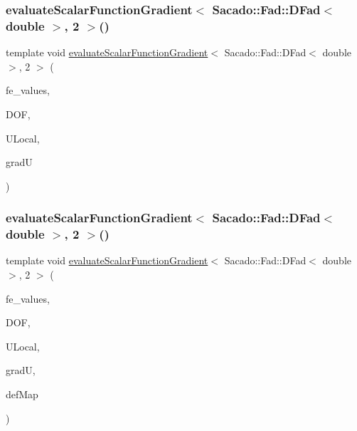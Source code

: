 \subsubsection{\texorpdfstring{evaluate\+Scalar\+Function\+Gradient$<$ Sacado\+::\+Fad\+::\+D\+Fad$<$ double $>$, 2 $>$()}{evaluateScalarFunctionGradient< Sacado::Fad::DFad< double >, 2 >()}\hspace{0.1cm}{\footnotesize\ttfamily [1/4]}}
{\footnotesize\ttfamily template void \mbox{\hyperlink{group___evaluation_functions_gabedd4ae2841d2332ed0df0513b189e34}{evaluate\+Scalar\+Function\+Gradient}}$<$ Sacado\+::\+Fad\+::\+D\+Fad$<$ double $>$, 2 $>$ (\begin{DoxyParamCaption}\item[{const F\+E\+Values$<$ 2 $>$ \&}]{fe\+\_\+values,  }\item[{unsigned int}]{D\+OF,  }\item[{Table$<$ 1, Sacado\+::\+Fad\+::\+D\+Fad$<$ double $>$$>$ \&}]{U\+Local,  }\item[{Table$<$ 2, Sacado\+::\+Fad\+::\+D\+Fad$<$ double $>$$>$ \&}]{gradU }\end{DoxyParamCaption})}

\mbox{\label{function_evaluations_8cc_a9314f95484440c9c86bff06911c6d52e}} 
\subsubsection{\texorpdfstring{evaluate\+Scalar\+Function\+Gradient$<$ Sacado\+::\+Fad\+::\+D\+Fad$<$ double $>$, 2 $>$()}{evaluateScalarFunctionGradient< Sacado::Fad::DFad< double >, 2 >()}\hspace{0.1cm}{\footnotesize\ttfamily [2/4]}}
{\footnotesize\ttfamily template void \mbox{\hyperlink{group___evaluation_functions_gabedd4ae2841d2332ed0df0513b189e34}{evaluate\+Scalar\+Function\+Gradient}}$<$ Sacado\+::\+Fad\+::\+D\+Fad$<$ double $>$, 2 $>$ (\begin{DoxyParamCaption}\item[{const F\+E\+Values$<$ 2 $>$ \&}]{fe\+\_\+values,  }\item[{unsigned int}]{D\+OF,  }\item[{Table$<$ 1, Sacado\+::\+Fad\+::\+D\+Fad$<$ double $>$$>$ \&}]{U\+Local,  }\item[{Table$<$ 2, Sacado\+::\+Fad\+::\+D\+Fad$<$ double $>$$>$ \&}]{gradU,  }\item[{\mbox{\hyperlink{structdeformation_map}{deformation\+Map}}$<$ Sacado\+::\+Fad\+::\+D\+Fad$<$ double $>$, 2 $>$ \&}]{def\+Map }\end{DoxyParamCaption})}


